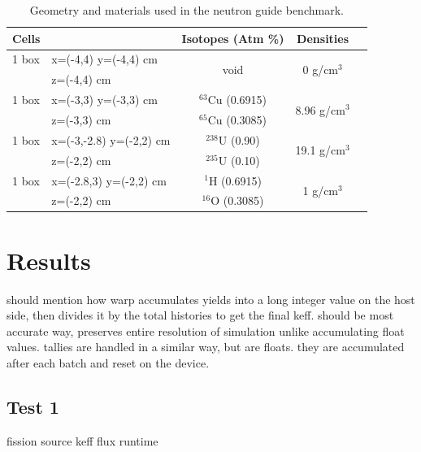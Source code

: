\documentclass[preprint,12pt]{elsarticle}
\begin{document}
\begin{table}[h]
\centering
\caption{Geometry and materials used in the neutron guide benchmark.}
\label{guide_geom}
\begin{tabular}{| l l | c | c | c |}
\hline
Cells & & Isotopes (Atm \%)& Densities \\
\hline
                1 box & x=(-4,4) y=(-4,4) cm &    \multirow{2}{*}{ void } &    \multirow{2}{*}{0 g/cm$^3$}   \\
                      & z=(-4,4) cm          &                            & \\
\hline
                1 box & x=(-3,3) y=(-3,3) cm  &   $^{63}$Cu   (0.6915) &    \multirow{2}{*}{8.96 g/cm$^3$} \\
                      & z=(-3,3) cm           &   $^{65}$Cu   (0.3085)& \\
\hline
                1 box & x=(-3,-2.8) y=(-2,2) cm   &   $^{238}$U   (0.90) &    \multirow{2}{*}{19.1 g/cm$^3$} \\
                      & z=(-2,2) cm             &   $^{235}$U   (0.10)& \\
\hline
                1 box & x=(-2.8,3) y=(-2,2) cm  &    $^{1}$H   (0.6915) &    \multirow{2}{*}{1 g/cm$^3$} \\
                      & z=(-2,2) cm            &   $^{16}$O  (0.3085)& \\
\hline
\end{tabular}
\end{table}



\section{Results}
\label{sec:results}

should mention how warp accumulates yields into a long integer value on the host side, then divides it by the total histories to get the final keff.  should be most accurate way, preserves entire resolution of simulation unlike accumulating float values.  tallies are handled in a similar way, but are floats.  they are accumulated after each batch and reset on the device.

\subsection{Test 1}

fission source
keff
flux
runtime
\end{document}
